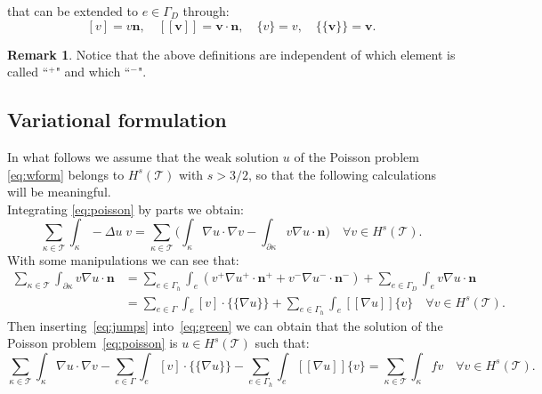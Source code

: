 \documentclass[12pt, a4paper]{article}
\theoremstyle{definition}
\theoremstyle{plain}
\theoremstyle{plain}
\theoremstyle{definition}
\newtheorem*{remark}{Remark}
\begin{document}
that can be extended to $e \in \Gamma_D$ through:
\begin{equation} \label{eq:jupsandaverdir}
	[v] = v \mathbf{n},
	\quad [\![ \mathbf{v} ]\!] = \mathbf{v} \cdot \mathbf{n},
	\quad \{v\} = v,
	\quad \{\!\!\{ \mathbf{v} \}\!\!\} = \mathbf{v}.
\end{equation}
\begin{remark}
	Notice that the above definitions are independent of which element is 
	called ``$^+$" and which ``$^-$".
\end{remark}
\subsection{Variational formulation}
In what follows we assume that the weak solution $u$ of the Poisson problem~ \eqref{eq:wform} belongs to $H^s(\mathcal{T})$ with $s > 3/2$, so that the following calculations will be meaningful.\\
Integrating \eqref{eq:poisson} by parts we obtain:
\begin{equation} \label{eq:green}
	\sum_{\kappa \in \mathcal{T}} \int_\kappa -\Delta u \; v
	= \sum_{\kappa \in \mathcal{T}} \bigg( \int_\kappa \nabla u \cdot \nabla v
	- \int_{\partial \kappa} v \nabla u \cdot \mathbf{n} \bigg) \quad \forall v 
	\in H^s(\mathcal{T}).
\end{equation}
With some manipulations we can see that:
\begin{equation} \label{eq:jumps}
\begin{split}
	\sum_{\kappa \in \mathcal{T}} \int_{\partial \kappa} v \nabla u \cdot \mathbf{n} &= \sum_{e \in \Gamma_h} \int_e (v^+ \nabla u^+ \cdot \mathbf{n}^+ + v^- \nabla u^- \cdot \mathbf{n}^- ) + \sum_{e \in \Gamma_D} \int_e v \nabla u \cdot \mathbf{n}\\
	&= \sum_{e \in \Gamma} \int_e [v] \cdot \{\!\!\{ \nabla u \}\!\!\} + \sum_{e \in \Gamma_h} \int_e [\![ 
	\nabla u ]\!] \{v\} \quad \forall v \in H^s(\mathcal{T}).
\end{split}
\end{equation}
Then inserting~\eqref{eq:jumps} into~\eqref{eq:green} we can obtain that the solution of the Poisson problem~\eqref{eq:poisson} is $u \in H^s(\mathcal{T})$ such that:
\begin{equation} \label{eq:firstform}
	\sum_{\kappa \in \mathcal{T}} \int_\kappa \nabla u \cdot \nabla v -
	\sum_{e \in \Gamma} \int_e [v] \cdot \{\!\!\{ \nabla u \}\!\!\} - \sum_{e \in \Gamma_h} \int_e [\![ \nabla u ]\!] \{v\} =
	\sum_{\kappa \in \mathcal{T}} \int_\kappa fv \quad \forall v \in 
	H^s(\mathcal{T}).
\end{equation}
\end{document}
